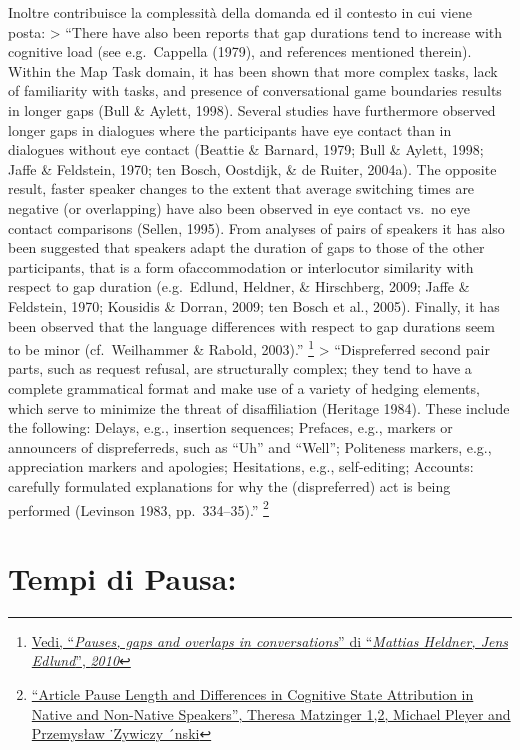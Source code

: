 \documentclass[
]{article}
\begin{document}
Inoltre contribuisce la complessità della domanda ed il contesto in cui viene posta: \textgreater{} ``There have also been reports that gap durations tend to increase with cognitive load (see e.g.~Cappella (1979), and references mentioned therein). Within the Map Task domain, it has been shown that more complex tasks, lack of familiarity with tasks, and presence of conversational game boundaries results in longer gaps (Bull \& Aylett, 1998). Several studies have furthermore observed longer gaps in dialogues where the participants have eye contact than in dialogues without eye contact (Beattie \& Barnard, 1979; Bull \& Aylett, 1998; Jaffe \& Feldstein, 1970; ten Bosch, Oostdijk, \& de Ruiter, 2004a). The opposite result, faster speaker changes to the extent that average switching times are negative (or overlapping) have also been observed in eye contact vs.~no eye contact comparisons (Sellen, 1995). From analyses of pairs of speakers it has also been suggested that speakers adapt the duration of gaps to those of the other participants, that is a form ofaccommodation or interlocutor similarity with respect to gap duration (e.g.~Edlund, Heldner, \& Hirschberg, 2009; Jaffe \& Feldstein, 1970; Kousidis \& Dorran, 2009; ten Bosch et al., 2005). Finally, it has been observed that the language differences with respect to gap durations seem to be minor (cf.~Weilhammer \& Rabold, 2003).'' \footnote{\href{DOC/1-s2.0-S0095447010000628-main.pdf}{Vedi, ``\emph{Pauses, gaps and overlaps in conversations}'' di ``\emph{Mattias Heldner, Jens Edlund}'', \emph{2010}}} \textgreater{} ``Dispreferred second pair parts, such as request refusal, are structurally complex; they tend to have a complete grammatical format and make use of a variety of hedging elements, which serve to minimize the threat of disaffiliation (Heritage 1984). These include the following: Delays, e.g., insertion sequences; Prefaces, e.g., markers or announcers of dispreferreds, such as ``Uh'' and ``Well''; Politeness markers, e.g., appreciation markers and apologies; Hesitations, e.g., self-editing; Accounts: carefully formulated explanations for why the (dispreferred) act is being performed (Levinson 1983, pp.~334--35).'' \footnote{\href{\%22DOC/languages-08-00026.pdf}{``Article Pause Length and Differences in Cognitive State Attribution in Native and Non-Native Speakers'', Theresa Matzinger 1,2, Michael Pleyer and Przemysław ˙Zywiczy ´nski}}

\section{Tempi di Pausa:}\label{tempi-di-pausa}
\end{document}
